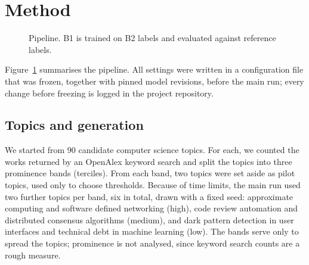 \documentclass[10pt,twocolumn]{article}
\begin{document}
\section{Method}
\begin{figure}[t]
\centering
{}
\caption{Pipeline. B1 is trained on B2 labels and evaluated against reference labels.}
\label{fig:pipeline}
\end{figure}

Figure~\ref{fig:pipeline} summarises the pipeline. All settings were written in a configuration file that was frozen, together with pinned model revisions, before the main run; every change before freezing is logged in the project repository.

\subsection{Topics and generation}
We started from 90 candidate computer science topics. For each, we counted the works returned by an OpenAlex keyword search \citep{priem2022openalex} and split the topics into three prominence bands (terciles). From each band, two topics were set aside as pilot topics, used only to choose thresholds. Because of time limits, the main run used two further topics per band, six in total, drawn with a fixed seed: approximate computing and software defined networking (high), code review automation and distributed consensus algorithms (medium), and dark pattern detection in user interfaces and technical debt in machine learning (low). The bands serve only to spread the topics; prominence is not analysed, since keyword search counts are a rough measure.
\end{document}
